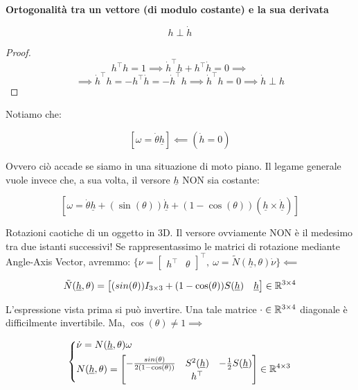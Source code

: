 \begin{prop}{\textbf{Ortogonalità tra un vettore (di modulo costante) e la sua derivata}}

\[
	h\perp\dot{h}
\]

\end{prop}

\begin{proof}

\[
	h^\top h=1 \implies \dot{h}^\top h + h^\top\dot{h} = 0 \implies
\]
\[
	\implies \dot{h}^\top h = -h^\top\dot{h} = -\dot{h}^\top h \implies \dot{h}^\top h = 0 \implies \dot{h}\perp h
\]

\end{proof}

Notiamo che:

\[
	[\omega=\dot{\theta}\underline{h}] \impliedby (\dot{h}=0)
\]

Ovvero ciò accade se siamo in una situazione di moto piano. Il legame generale vuole invece che, a sua volta, il versore $\underline{h}$ NON sia costante:

\[
	[\omega = \dot{\theta}\underline{h} + (\sin(\theta))\underline{\dot{h}} + (1-\cos(\theta))(\underline{h}\times \underline{\dot{h}})]
\]

Rotazioni caotiche di un oggetto in 3D. Il versore ovviamente NON è il medesimo tra due istanti successivi! Se rappresentassimo le matrici di rotazione mediante Angle-Axis Vector, avremmo: $\{\nu=\begin{bmatrix}h^\top&\theta\end{bmatrix}^\top,\ \omega=\tilde{N}(\underline{h},\theta)\dot{\nu}\} \impliedby$

\[
	\tilde{N}(\underline{h},\theta) = \begin{bmatrix}(sin(\theta))I_{3\times 3} + (1-\cos(\theta))S(\underline{h})&\underline{h}\end{bmatrix}\in\mathbb{R}^{3\times 4}
\]

L'espressione vista prima si può invertire. Una tale matrice $\mathord{\cdot}\in\mathbb{R}^{3\times 4}$ diagonale è difficilmente invertibile. Ma, $\cos(\theta)\neq 1 \implies$

\[
	\left\{
	\begin{aligned}
	&\dot{\nu} = N(\underline{h},\theta)\omega\\
	&N(\underline{h},\theta)=\begin{bmatrix}-\frac{sin(\theta)}{2(1-\cos(\theta))}&S^2(\underline{h})&-\frac{1}{2}S(\underline{h})\\ & h^\top & \end{bmatrix}\in\mathbb{R}^{4\times 3}
	\end{aligned}
	\right.
\]

